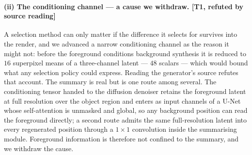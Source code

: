 \documentclass{article}
\begin{document}
\paragraph{(ii) The conditioning channel --- a cause we withdraw. \textnormal{[T1, refuted by source reading]}}
A selection method can only matter if the difference it selects for survives
into the render, and we advanced a narrow conditioning channel as the reason it
might not: before the foreground conditions background synthesis it is reduced
to $16$ superpixel means of a three-channel latent --- $48$ scalars --- which
would bound what any selection policy could express. Reading the generator's
source refutes that account. The summary is real but is one route among several.
The conditioning tensor handed to the diffusion denoiser retains the foreground
latent at full resolution over the object region and enters as input channels of
a U-Net whose self-attention is unmasked and global, so any background position
can read the foreground directly; a second route admits the same
full-resolution latent into every regenerated position through a $1\times1$
convolution inside the summarising module. Foreground information is therefore
not confined to the summary, and we withdraw the cause.
\end{document}
